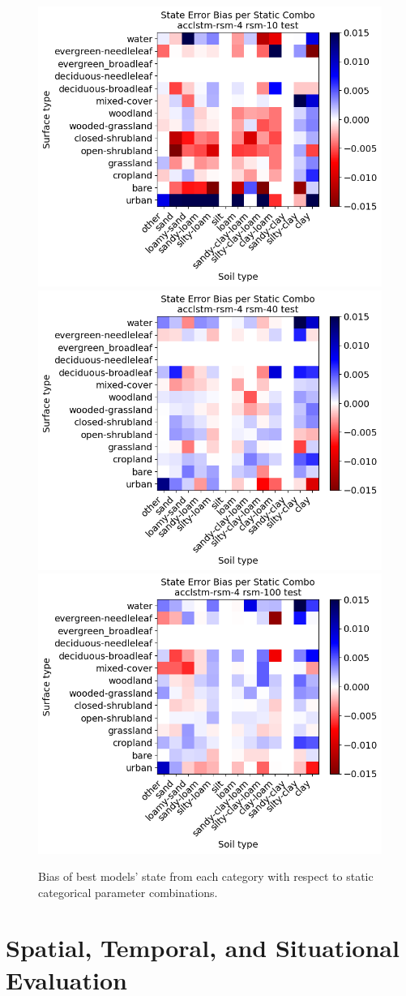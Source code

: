 \begin{figure}[hp!]
    \includegraphics[width=.32\linewidth,draft=false]{figures/static-combos/eval_test_acclstm-rsm-4_rsm-10_static-combos_bias_state.png}
    \includegraphics[width=.32\linewidth,draft=false]{figures/static-combos/eval_test_acclstm-rsm-4_rsm-40_static-combos_bias_state.png}
    \includegraphics[width=.32\linewidth,draft=false]{figures/static-combos/eval_test_acclstm-rsm-4_rsm-100_static-combos_bias_state.png}

    \caption{Bias of best models' state from each category with respect to static categorical parameter combinations.}
    \label{best-static-bias}
\end{figure}

\section{Spatial, Temporal, and Situational Evaluation}

